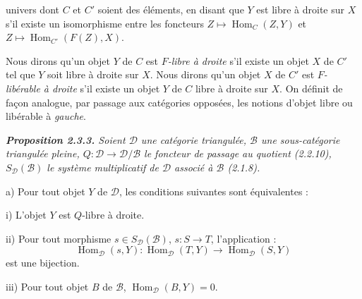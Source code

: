 \clearpage
{}%
\begingroup
\small
\setlength{\parskip}{0pt}%
\setlength{\emergencystretch}{1.5em}%
\setlength{\abovedisplayskip}{3pt plus 1pt minus 1pt}%
\setlength{\belowdisplayskip}{3pt plus 1pt minus 1pt}%

\noindent univers dont $C$ et $C'$ soient des éléments, en disant que $Y$
est libre à droite sur $X$ s'il existe un isomorphisme entre les foncteurs
$Z\longmapsto\operatorname{Hom}_C(Z,Y)$ et
$Z\longmapsto\operatorname{Hom}_{C'}(F(Z),X)$.

Nous dirons qu'un objet $Y$ de $C$ est \emph{$F$-libre à droite} s'il existe
un objet $X$ de $C'$ tel que $Y$ soit libre à droite sur $X$. Nous dirons
qu'un objet $X$ de $C'$ est \emph{$F$-libérable à droite} s'il existe un
objet $Y$ de $C$ libre à droite sur $X$. On définit de façon analogue, par
passage aux catégories opposées, les notions d'objet libre ou libérable à
\emph{gauche}.

\medskip
\begingroup\itshape
\noindent\textbf{Proposition 2.3.3.}\quad
Soient $\mathcal D$ une catégorie triangulée, $\mathcal B$ une
sous-catégorie triangulée pleine,
$Q\colon\mathcal D\longrightarrow\mathcal D/\mathcal B$ le foncteur de
passage au quotient (2.2.10), $S_{\mathcal D}(\mathcal B)$ le système
multiplicatif de $\mathcal D$ associé à $\mathcal B$ (2.1.8).

\par\noindent a) Pour tout objet $Y$ de $\mathcal D$, les conditions
suivantes sont équivalentes :

\par\noindent\hspace{1.2em}i) L'objet $Y$ est $Q$-libre à droite.

\par\noindent\hspace{1.2em}ii) Pour tout morphisme
$s\in S_{\mathcal D}(\mathcal B)$, $s\colon S\longrightarrow T$,
l'application :
\[
  \operatorname{Hom}_{\mathcal D}(s,Y)\colon
  \operatorname{Hom}_{\mathcal D}(T,Y)\longrightarrow
  \operatorname{Hom}_{\mathcal D}(S,Y)
\]
est une bijection.

\par\noindent\hspace{1.2em}iii) Pour tout objet $B$ de $\mathcal B$,
$\operatorname{Hom}_{\mathcal D}(B,Y)=0$.

